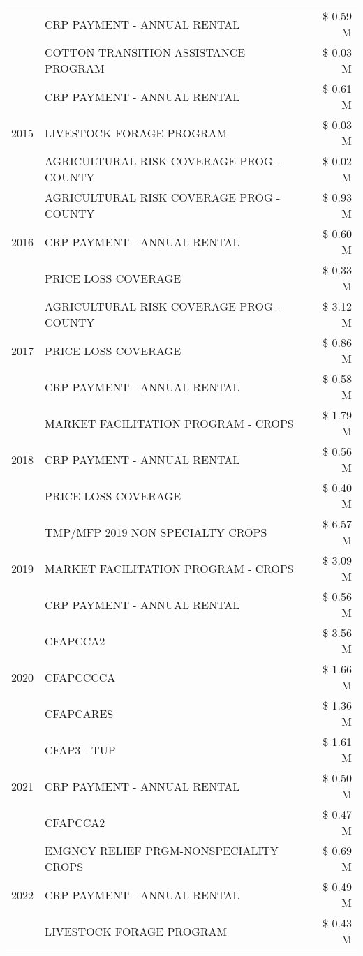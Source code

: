 \begin{tabular}{llr}
 & CRP PAYMENT - ANNUAL RENTAL & \$ 0.59 M \\
 & COTTON TRANSITION ASSISTANCE PROGRAM & \$ 0.03 M \\
\cline{1-3}
\multirow[t]{3}{*}{2015} & CRP PAYMENT - ANNUAL RENTAL & \$ 0.61 M \\
 & LIVESTOCK FORAGE PROGRAM & \$ 0.03 M \\
 & AGRICULTURAL RISK COVERAGE PROG - COUNTY & \$ 0.02 M \\
\cline{1-3}
\multirow[t]{3}{*}{2016} & AGRICULTURAL RISK COVERAGE PROG - COUNTY & \$ 0.93 M \\
 & CRP PAYMENT - ANNUAL RENTAL & \$ 0.60 M \\
 & PRICE LOSS COVERAGE & \$ 0.33 M \\
\cline{1-3}
\multirow[t]{3}{*}{2017} & AGRICULTURAL RISK COVERAGE PROG - COUNTY & \$ 3.12 M \\
 & PRICE LOSS COVERAGE & \$ 0.86 M \\
 & CRP PAYMENT - ANNUAL RENTAL & \$ 0.58 M \\
\cline{1-3}
\multirow[t]{3}{*}{2018} & MARKET FACILITATION PROGRAM - CROPS & \$ 1.79 M \\
 & CRP PAYMENT - ANNUAL RENTAL & \$ 0.56 M \\
 & PRICE LOSS COVERAGE & \$ 0.40 M \\
\cline{1-3}
\multirow[t]{3}{*}{2019} & TMP/MFP 2019 NON SPECIALTY CROPS & \$ 6.57 M \\
 & MARKET FACILITATION PROGRAM - CROPS & \$ 3.09 M \\
 & CRP PAYMENT - ANNUAL RENTAL & \$ 0.56 M \\
\cline{1-3}
\multirow[t]{3}{*}{2020} & CFAPCCA2 & \$ 3.56 M \\
 & CFAPCCCCA & \$ 1.66 M \\
 & CFAPCARES & \$ 1.36 M \\
\cline{1-3}
\multirow[t]{3}{*}{2021} & CFAP3 - TUP & \$ 1.61 M \\
 & CRP PAYMENT - ANNUAL RENTAL & \$ 0.50 M \\
 & CFAPCCA2 & \$ 0.47 M \\
\cline{1-3}
\multirow[t]{3}{*}{2022} & EMGNCY RELIEF PRGM-NONSPECIALITY CROPS & \$ 0.69 M \\
 & CRP PAYMENT - ANNUAL RENTAL & \$ 0.49 M \\
 & LIVESTOCK FORAGE PROGRAM & \$ 0.43 M \\
\cline{1-3}
\bottomrule
\end{tabular}
